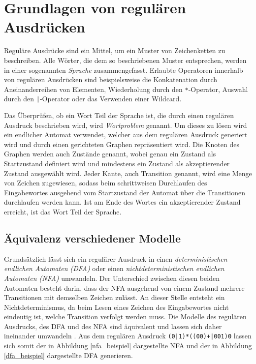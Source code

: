 \chapter{Grundlagen von regulären Ausdrücken}
\label{sec:regex}

Reguläre Ausdrücke sind ein Mittel, um ein Muster von Zeichenketten zu beschreiben.
Alle Wörter, die dem so beschriebenen Muster entsprechen, werden in einer sogenannten \emph{Sprache} zusammengefasst.
Erlaubte Operatoren innerhalb von regulären Ausdrücken sind beispielsweise die Konkatenation durch Aneinanderreihen von Elementen, Wiederholung durch den \texttt{*}-Operator, Auswahl durch den \texttt{|}-Operator oder das Verwenden einer Wildcard.

Das Überprüfen, ob ein Wort Teil der Sprache ist, die durch einen regulären Ausdruck beschrieben wird, wird \emph{Wortproblem} genannt.
Um dieses zu lösen wird ein endlicher Automat verwendet, welcher aus dem regulären Ausdruck generiert wird und durch einen gerichteten Graphen repräsentiert wird.
Die Knoten des Graphen werden auch Zustände genannt, wobei genau ein Zustand als Startzustand definiert wird und mindestens ein Zustand als akzeptierender Zustand ausgewählt wird.
Jeder Kante, auch Transition genannt, wird eine Menge von Zeichen zugewiesen, sodass beim schrittweisen Durchlaufen des Eingabewortes ausgehend vom Startzustand der Automat über die Transitionen durchlaufen werden kann.
Ist am Ende des Wortes ein akzeptierender Zustand erreicht, ist das Wort Teil der Sprache.

\section{Äquivalenz verschiedener Modelle}

Grundsätzlich lässt sich ein regulärer Ausdruck in einen \emph{deterministischen endlichen Automaten (DFA)} oder einen \emph{nichtdeterministischen endlichen Automaten (NFA)} umwandeln.
Der Unterschied zwischen diesen beiden Automaten besteht darin, dass der NFA ausgehend von einem Zustand mehrere Transitionen mit demselben Zeichen zulässt.
An dieser Stelle entsteht ein Nichtdeterminismus, da beim Lesen eines Zeichen des Eingabewortes nicht eindeutig ist, welche Transition verfolgt werden muss.
Die Modelle des regulären Ausdrucks, des DFA und des NFA sind äquivalent und lassen sich daher ineinander umwandeln \cite{Hopcroft2002}.
Aus dem regulären Ausdruck \texttt{(0|1)*((00)+|001)0} lassen sich somit der in Abbildung \ref{nfa_beispiel} dargestellte NFA und der in Abbildung \ref{dfa_beispiel} dargestellte DFA generieren.

